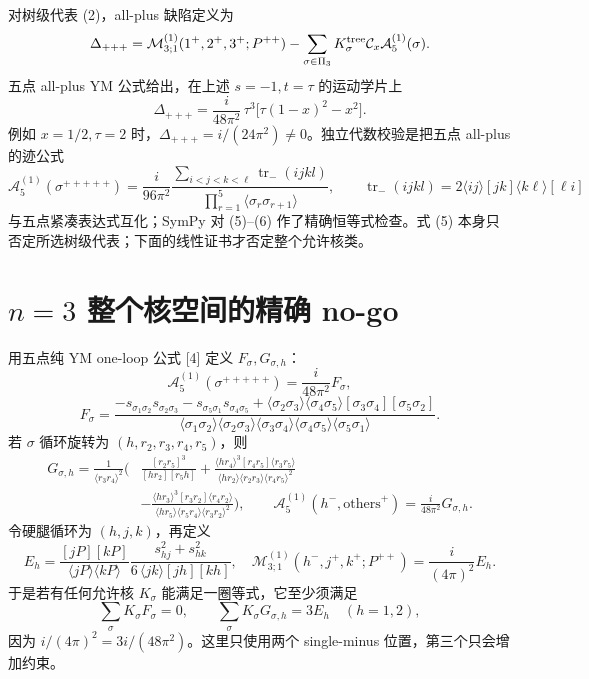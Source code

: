 \documentclass[UTF8,11pt]{ctexart}
\newcommand{\trm}{\operatorname{tr}_{-}}
\newcommand{\cA}{\mathcal A}
\newcommand{\cM}{\mathcal M}
\newcommand{\cC}{\mathcal C}
\begin{document}
对树级代表 (2)，all-plus 缺陷定义为
\[
\Delta_{+++}=\cM^{(1)}_{3;1}(1^+,2^+,3^+;P^{++})
-\sum_{\sigma\in\Pi_3}K^{\rm tree}_\sigma\cC_x\cA^{(1)}_5(\sigma).
\]
五点 all-plus YM 公式给出，在上述 $s=-1,t=\tau$ 的运动学片上
\[
\boxed{\displaystyle
\Delta_{+++}=\frac{i}{48\pi^2}\,\tau^3
\bigl[\tau(1-x)^2-x^2\bigr].}
\tag{5}
\]
例如 $x=1/2,\tau=2$ 时，$\Delta_{+++}=i/(24\pi^2)\ne0$。独立代数校验是把五点 all-plus 的迹公式
\[
\cA^{(1)}_5(\sigma^{+++++})
=\frac{i}{96\pi^2}\frac{\sum_{i<j<k<\ell}\trm(ijkl)}
{\prod_{r=1}^5\langle\sigma_r\sigma_{r+1}\rangle},
\qquad \trm(ijkl)=2\langle ij\rangle[jk]\langle k\ell\rangle[\ell i]
\tag{6}
\]
与五点紧凑表达式互化；SymPy 对 (5)--(6) 作了精确恒等式检查。式 (5) 本身只否定所选树级代表；下面的线性证书才否定整个允许核类。

\section{\texorpdfstring{$n=3$}{n=3} 整个核空间的精确 no-go}
用五点纯 YM one-loop 公式 [4] 定义 $F_\sigma,G_{\sigma,h}$：
\[
\cA^{(1)}_5(\sigma^{+++++})=\frac{i}{48\pi^2}F_\sigma,
\]
\[
F_\sigma=
\frac{
-s_{\sigma_1\sigma_2}s_{\sigma_2\sigma_3}
-s_{\sigma_5\sigma_1}s_{\sigma_4\sigma_5}
+\langle\sigma_2\sigma_3\rangle\langle\sigma_4\sigma_5\rangle
[\sigma_3\sigma_4][\sigma_5\sigma_2]}
{\langle\sigma_1\sigma_2\rangle\langle\sigma_2\sigma_3\rangle
\langle\sigma_3\sigma_4\rangle\langle\sigma_4\sigma_5\rangle
\langle\sigma_5\sigma_1\rangle}.
\tag{7}
\]
若 $\sigma$ 循环旋转为 $(h,r_2,r_3,r_4,r_5)$，则
\begin{align*}
G_{\sigma,h}=\frac{1}{\langle r_3r_4\rangle^2}\Bigg(&
\frac{[r_2r_5]^3}{[hr_2][r_5h]}
+\frac{\langle hr_4\rangle^3[r_4r_5]\langle r_3r_5\rangle}
{\langle hr_2\rangle\langle r_2r_3\rangle\langle r_4r_5\rangle^2}\\[-2pt]
&-\frac{\langle hr_3\rangle^3[r_3r_2]\langle r_4r_2\rangle}
{\langle hr_5\rangle\langle r_5r_4\rangle\langle r_3r_2\rangle^2}
\Bigg),\qquad
\cA^{(1)}_5(h^-,\text{others}^+)=\frac{i}{48\pi^2}G_{\sigma,h}.
\tag{8}
\end{align*}
令硬腿循环为 $(h,j,k)$，再定义
\[
E_h=\frac{[jP][kP]}{\langle jP\rangle\langle kP\rangle}
\frac{s_{hj}^2+s_{hk}^2}{6\,\langle jk\rangle[jh][kh]},
\quad
\cM^{(1)}_{3;1}(h^-,j^+,k^+;P^{++})=\frac{i}{(4\pi)^2}E_h.
\tag{9}
\]
于是若有任何允许核 $K_\sigma$ 能满足一圈等式，它至少须满足
\[
\sum_{\sigma}K_\sigma F_\sigma=0,
\qquad
\sum_{\sigma}K_\sigma G_{\sigma,h}=3E_h\quad(h=1,2),
\tag{10}
\]
因为 $i/(4\pi)^2=3i/(48\pi^2)$。这里只使用两个 single-minus 位置，第三个只会增加约束。
\end{document}
